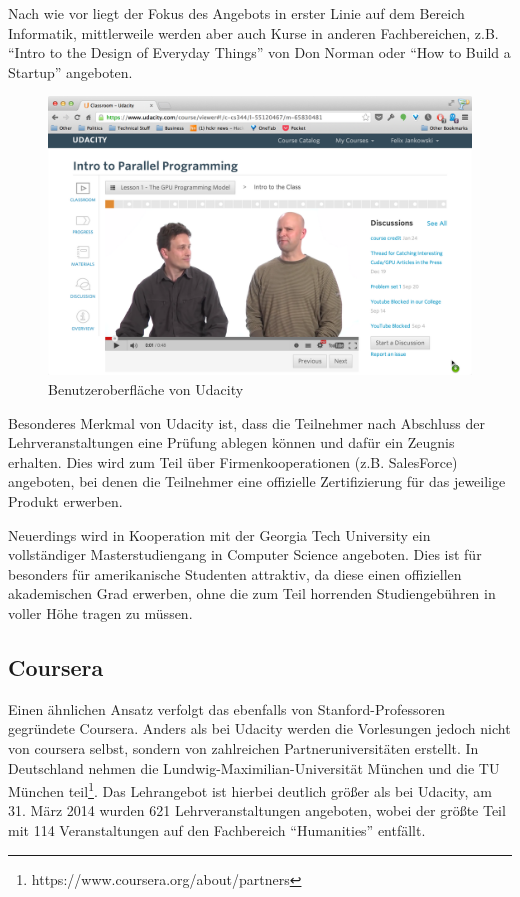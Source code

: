 			Nach wie vor liegt der Fokus des Angebots in erster Linie auf dem Bereich Informatik, mittlerweile werden aber auch Kurse in anderen Fachbereichen, z.B. "`Intro to the Design of Everyday Things"' von Don Norman oder "`How to Build a Startup"' angeboten.


			\begin{figure}[h]
				\begin{center}
					\includegraphics[width=\textwidth]{img/udacity}
					\caption{Benutzeroberfläche von Udacity}
					\label{fig:screenshot-udacity}
				\end{center}
			\end{figure}

			Besonderes Merkmal von Udacity ist, dass die Teilnehmer nach Abschluss der Lehrveranstaltungen eine Prüfung ablegen können und dafür ein Zeugnis erhalten.
			Dies wird zum Teil über Firmenkooperationen (z.B. SalesForce) angeboten, bei denen die Teilnehmer eine offizielle Zertifizierung für das jeweilige Produkt erwerben.

			Neuerdings wird in Kooperation mit der Georgia Tech University ein vollständiger Masterstudiengang in Computer Science angeboten.
			Dies ist für besonders für amerikanische Studenten attraktiv, da diese einen offiziellen akademischen Grad erwerben, ohne die zum Teil horrenden Studiengebühren in voller Höhe tragen zu müssen.

		\subsection{Coursera}

			Einen ähnlichen Ansatz verfolgt das ebenfalls von Stanford-Professoren gegründete Coursera.
			Anders als bei Udacity werden die Vorlesungen jedoch nicht von coursera selbst, sondern von zahlreichen Partneruniversitäten erstellt.
			In Deutschland nehmen die Lundwig-Maximilian-Universität München und die TU München teil\footnote{https://www.coursera.org/about/partners}. 
			Das Lehrangebot ist hierbei deutlich größer als bei Udacity, am 31. März 2014 wurden 621 Lehrveranstaltungen angeboten, wobei der größte Teil mit 114 Veranstaltungen auf den Fachbereich "`Humanities"' entfällt.


